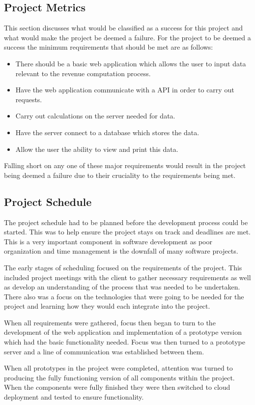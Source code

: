 \subsection{Project Metrics}
This section discusses what would be classified as a success for this project and what would make the project be deemed a failure. For the project to be deemed a success the minimum requirements that should be met are as follows:
\begin{itemize}
    \item There should be a basic web application which allows the user to input data relevant to the revenue computation process.
    \item Have the web application communicate with a API in order to carry out requests.
    \item Carry out calculations on the server needed for data.
    \item Have the server connect to a database which stores the data.
    \item Allow the user the ability to view and print this data.
\end{itemize}
Falling short on any one of these major requirements would result in the project being deemed a failure due to their cruciality to the requirements being met.

\subsection{Project Schedule}
The project schedule had to be planned before the development process could be started. This was to help ensure the project stays on track and deadlines are met. This is a very important component in software development as poor organization and time management is the downfall of many software projects. \par
The early stages of scheduling focused on the requirements of the project. This included project meetings with the client to gather necessary requirements as well as develop an understanding of the process that was needed to be undertaken. There also was a focus on the technologies that were going to be needed for the project and learning how they would each integrate into the project. \par
When all requirements were gathered, focus then began to turn to the development of the web application and implementation of a prototype version which had the basic functionality needed. Focus was then turned to a prototype server and a line of communication was established  between them. \par
When all prototypes in the project were completed, attention was turned to producing the fully functioning version of all components within the project. When the components were fully finished they were then switched to cloud deployment and tested to ensure functionality.

